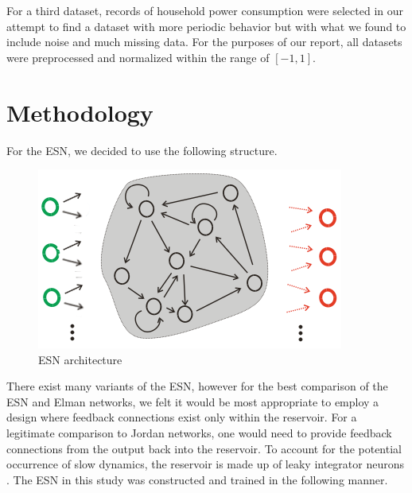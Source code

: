 \documentclass{acm_proc_article-sp}
\begin{document}
For a third dataset, records of household power consumption \cite{Hebrail+Berard:2012} were selected in our attempt to find a dataset with more periodic behavior but with what we found to include noise and much missing data. For the purposes of our report, all datasets were preprocessed and normalized within the range of $[-1,1]$.

\section{Methodology}

For the ESN, we decided to use the following structure.
\begin{figure}[here]
\begin{center}
\includegraphics[scale=0.35]{ESNStructure.png}
\caption{ESN architecture}
\end{center}
\label{fig:esn_structure}
\end{figure}
There exist many variants of the ESN, however for the best comparison of the ESN and Elman networks, we felt it would be most appropriate to employ a design where feedback connections exist only within the reservoir. For a legitimate comparison to Jordan networks, one would need to provide feedback connections from the output back into the reservoir. To account for the potential occurrence of slow dynamics, the reservoir is made up of leaky integrator neurons \cite{Jaeger1}. The ESN in this study was constructed and trained in the following manner.
\end{document}
